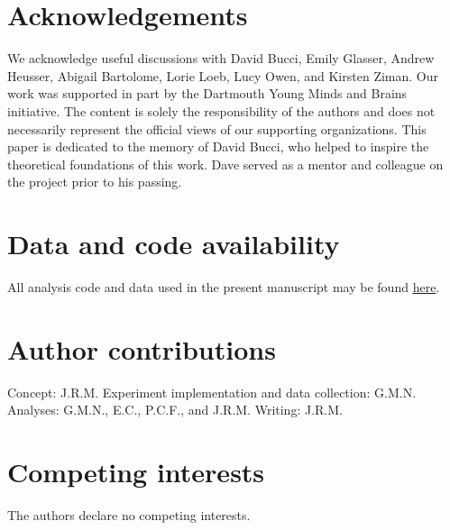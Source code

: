\documentclass[10pt]{article}
\begin{document}
   


\section*{Acknowledgements}
We acknowledge useful discussions with David Bucci, Emily Glasser,
Andrew Heusser, Abigail Bartolome, Lorie Loeb, Lucy Owen, and Kirsten
Ziman.  Our work was supported in part by the Dartmouth Young Minds
and Brains initiative.  The content is solely the responsibility of
the authors and does not necessarily represent the official views of
our supporting organizations.  This paper is dedicated to the memory
of David Bucci, who helped to inspire the theoretical foundations of
this work.  Dave served as a mentor and colleague on the project prior
to his passing.


\section*{Data and code availability}
All analysis code and data used in the present manuscript may be found
\href{https://github.com/ContextLab/brainfit-paper}{\underline{here}}.

\section*{Author contributions}
Concept: J.R.M.  Experiment implementation and data collection: G.M.N.
Analyses: G.M.N., E.C., P.C.F., and J.R.M.  Writing: J.R.M.

\section*{Competing interests}
The authors declare no competing interests.



\end{document}
